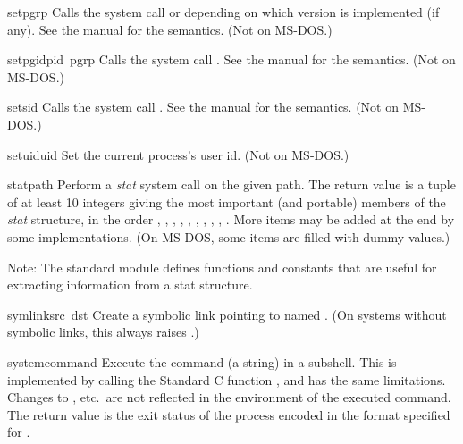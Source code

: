 \begin{funcdesc}{setpgrp}{}
Calls the system call  or 
depending on which version is implemented (if any).  See the \UNIX{}
manual for the semantics.
(Not on MS-DOS.)
\end{funcdesc}

\begin{funcdesc}{setpgid}{pid\, pgrp}
Calls the system call .  See the \UNIX{} manual for
the semantics.
(Not on MS-DOS.)
\end{funcdesc}

\begin{funcdesc}{setsid}{}
Calls the system call .  See the \UNIX{} manual for the
semantics.
(Not on MS-DOS.)
\end{funcdesc}

\begin{funcdesc}{setuid}{uid}
Set the current process's user id.
(Not on MS-DOS.)
\end{funcdesc}

\begin{funcdesc}{stat}{path}
Perform a {\em stat} system call on the given path.  The return value
is a tuple of at least 10 integers giving the most important (and
portable) members of the {\em stat} structure, in the order
,
,
,
,
,
,
,
,
,
.
More items may be added at the end by some implementations.
(On MS-DOS, some items are filled with dummy values.)

Note: The standard module  defines functions and constants
that are useful for extracting information from a stat structure.
\end{funcdesc}

\begin{funcdesc}{symlink}{src\, dst}
Create a symbolic link pointing to  named .  (On
systems without symbolic links, this always raises
.)
\end{funcdesc}

\begin{funcdesc}{system}{command}
Execute the command (a string) in a subshell.  This is implemented by
calling the Standard C function , and has the same
limitations.  Changes to ,  etc.\ are
not reflected in the environment of the executed command.  The return
value is the exit status of the process encoded in the format
specified for .
\end{funcdesc}


